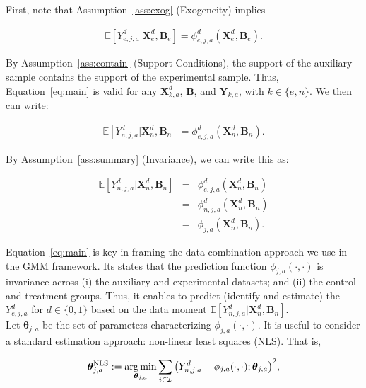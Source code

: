 \noindent First, note that Assumption~\ref{ass:exog} (Exogeneity) implies

\begin{eqnarray}
\mathbb{E} \left[ Y_{e,j,a}^d | \bm{X}_{e}^d, \bm{B}_{e} \right] =  \phi^d_{e,j,a}\left( \bm{X}_{e}^d, \bm{B}_{e} \right). \label{eq:main}
\end{eqnarray}

\noindent By Assumption~\ref{ass:contain} (Support Conditions), the support of the auxiliary sample contains the support of the experimental sample. Thus, Equation~\eqref{eq:main} is valid for any $\bm{X}^d_{k,a}$, $\bm{B}$, and $\bm{Y}_{k,a}$, with $k \in \{ e, n\}$. We then can write: 

\begin{eqnarray}
\mathbb{E} \left[ Y_{n,j,a}^d | \bm{X}_{n}^d, \bm{B}_{n} \right] =  \phi^d_{e,j,a}\left( \bm{X}_{n}^d, \bm{B}_{n} \right).
\end{eqnarray}

\noindent By Assumption~\ref{ass:summary} (Invariance), we can write this as: 

\begin{eqnarray}
\mathbb{E} \left[ Y_{n,j,a}^d | \bm{X}_{n}^d, \bm{B}_{n} \right] &=&  \phi^d_{e,j,a}\left( \bm{X}_{n}^d, \bm{B}_{n} \right) \nonumber \\ 
 &=&  \phi^d_{n,j,a}\left( \bm{X}_{n}^d, \bm{B}_{n} \right) \nonumber \\
 &=&  \phi_{j,a}\left( \bm{X}_{n}^d, \bm{B}_{n} \right). \label{eq:mainpred}
\end{eqnarray}

\noindent Equation~\eqref{eq:main} is key in framing the data combination approach we use in the GMM framework. Its states that the prediction function $\phi_{j,a} \left( \cdot, \cdot \right) $ is invariance across (i) the auxiliary and experimental datasets; and (ii) the control and treatment groups. Thus, it enables to predict (identify and estimate) the $Y_{e,j,a}^d$ for $d \in \{0, 1\}$ based on the data moment $\mathbb{E} \left[ Y_{n,j,a}^d | \bm{X}_{n}^d, \bm{B}_{n} \right] $.\\

\noindent Let $\bm{\theta}_{j,a}$ be the set of parameters characterizing $\phi_{j,a}\left( \cdot, \cdot \right)$. It is useful to consider a standard estimation approach: non-linear least squares (NLS). That is, 

\begin{equation}
 \bm{\theta}_{j,a}^{\text{NLS}} := \operatorname*{arg\,min}_{\bm{\theta}_{j,a}} \sum \limits _{i \in \mathcal{I}} {\left( Y^d_{n,j,a}  - \phi_{j,a} (\cdot , \cdot); \bm{\theta}_{j,a} \right)}^2, 
\end{equation}


